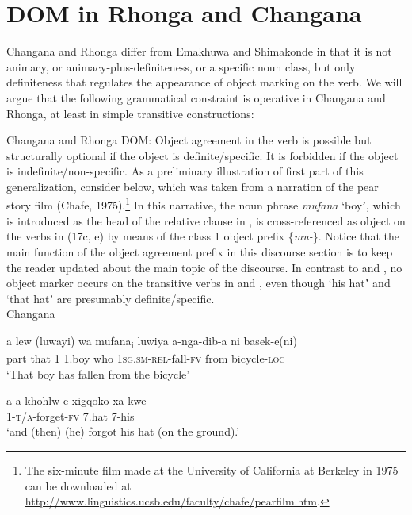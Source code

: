 \documentclass[output=paper]{langsci/langscibook}
\begin{document}
\section{DOM in Rhonga and Changana}

Changana and Rhonga differ from Emakhuwa and Shimakonde in that it is not animacy, or animacy-plus-definiteness, or a specific noun class, but only definiteness that regulates the appearance of object marking on the verb. We will argue that the following grammatical constraint is operative in Changana and Rhonga, at least in simple transitive constructions:

{Changana and Rhonga DOM: Object agreement in the verb is possible but structurally optional if the object is definite/specific. It is forbidden if the object is indefinite/non-specific.}
     {As a preliminary illustration of first part of this generalization, consider } {below, which was taken from a narration of the pear story film (Chafe, 1975).}\footnote{ {The six-minute film made at the University of California at Berkeley in 1975 can be downloaded at }\url{http://www.linguistics.ucsb.edu/faculty/chafe/pearfilm.htm}{.}} {In this narrative, the noun phrase }{\textit{mufana}} {‘boyʼ, which is introduced as the head of the relative clause in , is cross-referenced as object on the verbs in (17c, e) by means of the class 1 object prefix \{}{\textit{mu-}}{\}. Notice that the main function of the object agreement prefix in this discourse section is to keep the reader updated about the} {}{main topic of the discourse. In contrast to  and , no object marker occurs on the transitive verbs in  and , even though ‘his hatʼ  and ‘that hatʼ  are presumably definite/specific.}\\
{Changana}

\ea
\gll a         lew (luwayi)  wa    mufana\textup{\textsubscript{i}}   luwiya    a-nga-dib-a             ni          basek-e(ni)\\
     part    that                 1      1.boy       who       \textsc{1sg.sm-rel}{}-fall-\textsc{fv}  from     bicycle-\textsc{loc}\\
\glt ‘That boy has fallen from the bicycle’
\z


\ea
\gll a-a-khohlw-e               xigqoko          xa-kwe\\
     1-\textsc{t/a}{}-forget-\textsc{fv}           7.hat                7-his\\
\glt ‘and (then) (he) forgot his hat (on the ground).’
\z
\end{document}
